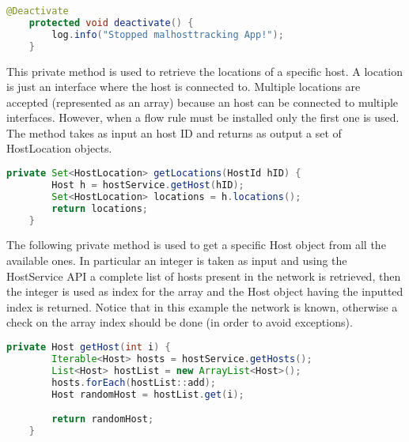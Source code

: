 \documentclass[a4paper,10pt]{memoir}
\begin{document}
\begin{lstlisting}[language=java,firstnumber=91]
    @Deactivate
    protected void deactivate() {
        log.info("Stopped malhosttracking App!");
    }
\end{lstlisting}

This private method is used to retrieve the locations of a specific host. A location is just an interface where the host is connected to. Multiple locations are accepted (represented as an array) because an host can be connected to multiple interfaces. However, when a flow rule must be installed only the first one is used. The method takes as input an host ID and returns as output a set of HostLocation objects.
\begin{lstlisting}[language=java,firstnumber=139]
    private Set<HostLocation> getLocations(HostId hID) {
        Host h = hostService.getHost(hID);
        Set<HostLocation> locations = h.locations();
        return locations;
    }
\end{lstlisting}

The following private method is used to get a specific Host object from all the available ones. In particular an integer is taken as input and using the HostService API a complete list of hosts present in the network is retrieved, then the integer is used as index for the array and the Host object having the inputted index is returned. Notice that in this example the network is known, otherwise a check on the array index should be done (in order to avoid exceptions).  
\begin{lstlisting}[language=java,firstnumber=165]
    private Host getHost(int i) {
        Iterable<Host> hosts = hostService.getHosts();
        List<Host> hostList = new ArrayList<Host>();
        hosts.forEach(hostList::add);
        Host randomHost = hostList.get(i);

        return randomHost;
    }
\end{lstlisting}
\end{document}
